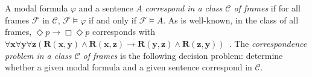 \documentclass[draft]{article}
\def\mdef{\mathtt{md}}
\begin{document}
%
%
%
%
%
%
\\
\\
%
%
A modal formula $\varphi$ and a sentence $A$ {\it correspond in a class ${\mathcal C}$ of frames}\/ if for all frames ${\mathcal F}$ in ${\mathcal C}$, ${\mathcal F}{\models}\varphi$ if and only if ${\mathcal F}{\models}A$.
As is well-known, in the class of all frames, $\Diamond p\rightarrow\Box\Diamond p$ corresponds with $\forall\mathbf{x}\forall\mathbf{y}\forall\mathbf{z}(\mathbf{R}(\mathbf{x},\mathbf{y})\wedge\mathbf{R}(\mathbf{x},\mathbf{z})\rightarrow\mathbf{R}(\mathbf{y},\mathbf{z})\wedge\mathbf{R}(\mathbf{z},\mathbf{y}))$~\cite[Chapter~$3$]{Blackburn:deRijke:Venema:2001}.
The {\it correspondence problem in a class ${\mathcal C}$ of frames}\/ is the following decision problem: determine whether a given modal formula and a given sentence correspond in ${\mathcal C}$.
%
%
%
%
\\
\\
%
%
%
%
\end{document}
